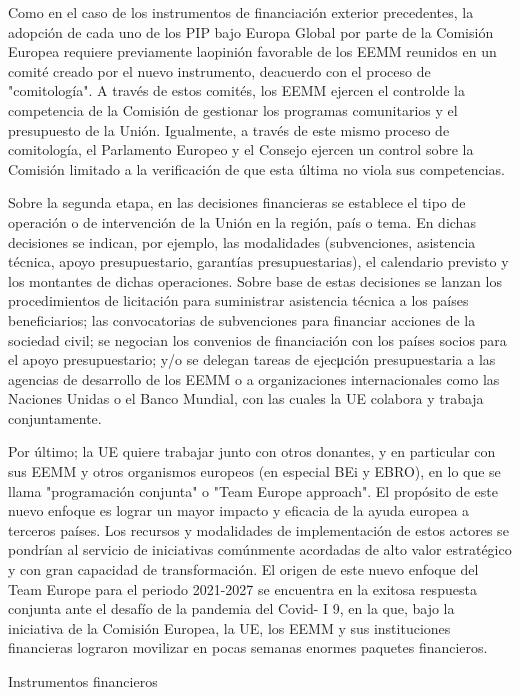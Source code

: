 \documentclass[10pt,a4paper]{article}
\begin{document}
{Como en el caso de los instrumentos de financiación exterior precedentes, la adopción de cada uno de los PIP bajo Europa Global por parte de la Comisión Europea requiere previamente laopinión favorable de los EEMM reunidos en un comité creado por el nuevo instrumento, deacuerdo con el proceso de "comitología". A través de estos comités, los EEMM ejercen el controlde la competencia de la Comisión de gestionar los programas comunitarios y el presupuesto de la Unión. Igualmente, a través de este mismo proceso de comitología, el Parlamento Europeo y el Consejo ejercen un control sobre la Comisión limitado a la verificación de que esta última no viola sus competencias.

Sobre la segunda etapa, en las decisiones financieras se establece el tipo de operación o de intervención de la Unión en la región, país o tema. En dichas decisiones se indican, por ejemplo, las modalidades (subvenciones, asistencia técnica, apoyo presupuestario, garantías presupuestarias), el calendario previsto y los montantes de dichas operaciones. Sobre base de estas decisiones se lanzan los procedimientos de licitación para suministrar asistencia técnica a los países beneficiarios; las convocatorias de subvenciones para financiar acciones de la sociedad civil; se negocian los convenios de financiación con los países socios para el apoyo presupuestario; y/o se delegan tareas de ejecμción presupuestaria a las agencias de desarrollo de los EEMM o a organizaciones internacionales como las Naciones Unidas o el Banco Mundial, con las cuales la UE colabora y trabaja conjuntamente.

Por último; la UE quiere trabajar junto con otros donantes, y en particular con sus EEMM y otros organismos europeos (en especial BEi y EBRO), en lo que se llama "programación conjunta" o "Team Europe approach". El propósito de este nuevo enfoque es lograr un mayor impacto y eficacia de la ayuda europea a terceros países. Los recursos y modalidades de implementación de estos actores se pondrían al servicio de iniciativas comúnmente acordadas de alto valor estratégico y con gran capacidad de transformación. El origen de este nuevo enfoque del Team Europe para el periodo 2021-2027 se encuentra en la exitosa respuesta conjunta ante el desafío de la pandemia del Covid- I 9, en la que, bajo la iniciativa de la Comisión Europea, la UE, los EEMM y sus instituciones financieras lograron movilizar en pocas semanas enormes paquetes financieros.


Instrumentos financieros

}
\end{document}
